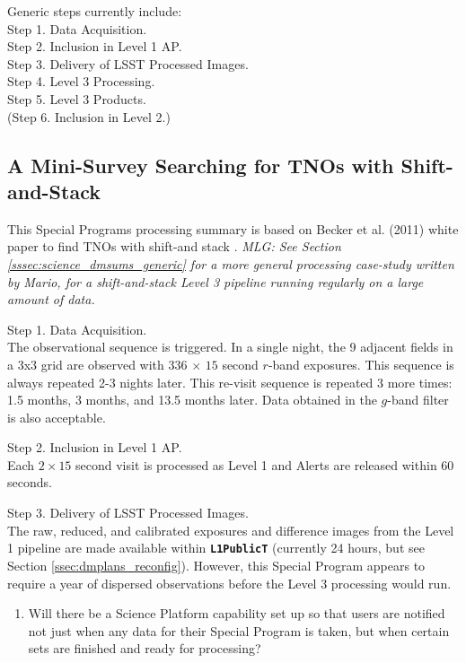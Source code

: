 \documentclass[DM,lsstdraft,toc]{lsstdoc}
\begin{document}
Generic steps currently include: \\
Step 1. Data Acquisition. \\
Step 2. Inclusion in Level 1 AP. \\
Step 3. Delivery of LSST Processed Images. \\
Step 4. Level 3 Processing. \\
Step 5. Level 3 Products. \\
(Step 6. Inclusion in Level 2.) \\

\subsection{A Mini-Survey Searching for TNOs with Shift-and-Stack}\label{ssec:SPCS_MM}

This Special Programs processing summary is based on Becker et al. (2011) white paper to find TNOs with shift-and stack \citep{BeckerWP}. {\it MLG: See Section \ref{sssec:science_dmsums_generic} for a more general processing case-study written by Mario, for a shift-and-stack Level 3 pipeline running regularly on a large amount of data.}

Step 1. Data Acquisition. \\ The observational sequence is triggered. In a single night, the 9 adjacent fields in a 3x3 grid are observed with $336$ $\times$ $15$ second $r$-band exposures. This sequence is always repeated 2-3 nights later. This re-visit sequence is repeated 3 more times: 1.5 months, 3 months, and 13.5 months later. Data obtained in the $g$-band filter is also acceptable. \citep{BeckerWP}

Step 2. Inclusion in Level 1 AP. \\ Each $2\times15$ second visit is processed as Level 1 and Alerts are released within 60 seconds.

Step 3. Delivery of LSST Processed Images. \\ The raw, reduced, and calibrated exposures and difference images from the Level 1 pipeline are made available within {\tt \textbf{L1PublicT}} (currently 24 hours, but see Section \ref{ssec:dmplans_reconfig}). However, this Special Program appears to require a year of dispersed observations before the Level 3 processing would run.
\begin{enumerate}[resume,topsep=-10pt,label= \textbf{Concern \Roman*.}] \item \label{C13} Will there be a Science Platform capability set up so that users are notified not just when any data for their Special Program is taken, but when certain sets are finished and ready for processing? \end{enumerate}
\end{document}
